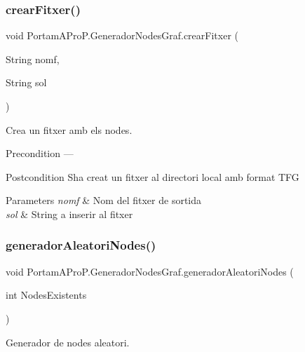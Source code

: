 \subsubsection{\texorpdfstring{crear\+Fitxer()}{crearFitxer()}}
{\footnotesize\ttfamily void Portam\+A\+Pro\+P.\+Generador\+Nodes\+Graf.\+crear\+Fitxer (\begin{DoxyParamCaption}\item[{String}]{nomf,  }\item[{String}]{sol }\end{DoxyParamCaption})}



Crea un fitxer amb els nodes. 

\begin{DoxyPrecond}{Precondition}
--- 
\end{DoxyPrecond}
\begin{DoxyPostcond}{Postcondition}
S\textquotesingle{}ha creat un fitxer al directori local amb format T\+FG 
\end{DoxyPostcond}

\begin{DoxyParams}{Parameters}
{\em nomf} & Nom del fitxer de sortida \\
\hline
{\em sol} & String a inserir al fitxer \\
\hline
\end{DoxyParams}
\mbox{\label{class_portam_a_pro_p_1_1_generador_nodes_graf_aca80784e2f6b7a5ed13029e4dd993a44}} 
\subsubsection{\texorpdfstring{generador\+Aleatori\+Nodes()}{generadorAleatoriNodes()}}
{\footnotesize\ttfamily void Portam\+A\+Pro\+P.\+Generador\+Nodes\+Graf.\+generador\+Aleatori\+Nodes (\begin{DoxyParamCaption}\item[{int}]{Nodes\+Existents }\end{DoxyParamCaption})}



Generador de nodes aleatori. 

